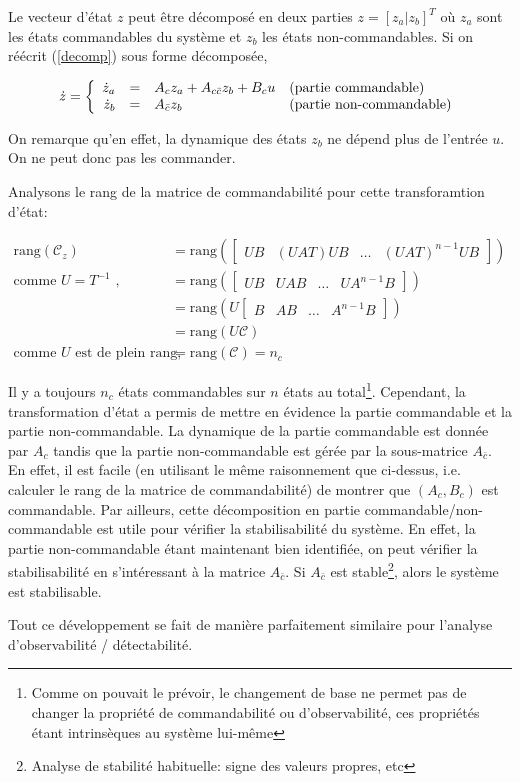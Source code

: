 \documentclass[10pt,letterpaper]{article}
\begin{document}
Le vecteur d'état $z$ peut être décomposé en deux parties $z = [z_a|z_b]^T$ où $z_a$ sont les états commandables du système et $z_b$ les états non-commandables. Si on réécrit (\ref{decomp}) sous forme décomposée,

\begin{equation*}
\dot{z} = 
\left\{
\begin{array}{r c ll}
\dot{z}_a &=& A_c z_a + A_{c\bar{c}} z_b + B_c u & \text{(partie commandable)}\\
\dot{z}_b &=& A_{\bar{c}} z_b & \text{(partie non-commandable)}
\end{array}
\right.
\end{equation*}

On remarque qu'en effet, la dynamique des états $z_b$ ne dépend plus de l'entrée $u$. On ne peut donc pas les commander.

Analysons le rang de la matrice de commandabilité pour cette transforamtion d'état:

\begin{align*}
\text{rang}(\mathcal{C}_z) &= \text{rang}
\left(
\begin{bmatrix}
UB & (UAT)UB & \dots & (UAT)^{n-1}UB
\end{bmatrix}
\right)\\
\text{comme $U = T^{-1}$ , }&= \text{rang}
\left(
\begin{bmatrix}
UB & UAB & \dots & UA^{n-1}B
\end{bmatrix}
\right)\\
&= \text{rang}
\left(
U
\begin{bmatrix}
B & AB & \dots & A^{n-1}B
\end{bmatrix}
\right)\\
&= \text{rang}(U\mathcal{C})\\
\text{comme $U$ est de plein rang, }&= \text{rang}(\mathcal{C}) = n_c
\end{align*}

Il y a toujours $n_c$ états commandables sur $n$ états au total\footnote{Comme on pouvait le prévoir, le changement de base ne permet pas de changer la propriété de commandabilité ou d'observabilité, ces propriétés étant intrinsèques au système lui-même}.
Cependant, la transformation d'état a permis de mettre en évidence la partie commandable et la partie non-commandable. La dynamique de la partie commandable est donnée par $A_c$ tandis que la partie non-commandable est gérée par la sous-matrice $A_{\bar{c}}$. En effet, il est facile (en utilisant le même raisonnement que ci-dessus, i.e. calculer le rang de la matrice de commandabilité) de montrer que $(A_c,B_c)$ est commandable.
Par ailleurs, cette décomposition en partie commandable/non-commandable est utile pour vérifier la stabilisabilité du système. En effet, la partie non-commandable étant maintenant bien identifiée, on peut vérifier la stabilisabilité en s'intéressant à la matrice $A_{\bar{c}}$.
Si $A_{\bar{c}}$ est stable\footnote{Analyse de stabilité habituelle: signe des valeurs propres, etc}, alors le système est stabilisable.

Tout ce développement se fait de manière parfaitement similaire pour l'analyse d'observabilité / détectabilité.
\end{document}
